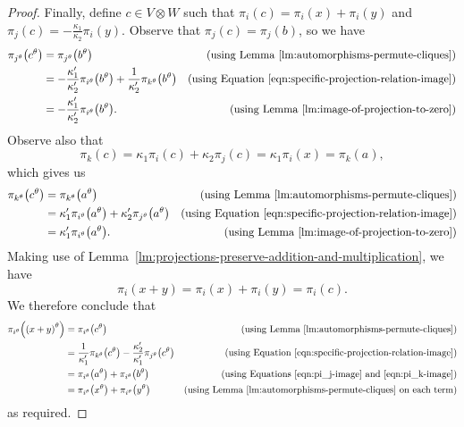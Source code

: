 \begin{proof}
Finally, define $c \in V \otimes W$ such that $\pi_i{\left(c \right)} = \pi_i{\left(x \right)} + \pi_i{\left(y \right)}$ and $\pi_j{\left(c \right)} = -\frac{\kappa_1}{\kappa_2} \pi_i{\left(y \right)}$. Observe that $\pi_j{\left(c \right)} = \pi_j{\left(b \right)}$, so we have
\begin{align}
    \pi_{j^\theta}{\left(c^\theta \right)} &= \pi_{j^\theta}{\left(b^\theta \right)} & \text{(using Lemma~\ref{lm:automorphisms-permute-cliques})} \notag \\
    &= -\frac{\kappa'_1}{\kappa'_2} \pi_{i^\theta}{\left(b^\theta \right)} + \frac{1}{\kappa'_2} \pi_{k^\theta}{\left(b^\theta \right)} & \text{(using Equation \eqref{eqn:specific-projection-relation-image})} \notag \\
    &= -\frac{\kappa'_1}{\kappa'_2} \pi_{i^\theta}{\left(b^\theta \right)}. & \text{(using Lemma~\ref{lm:image-of-projection-to-zero})} \label{eqn:pi_j-image}
\end{align}
Observe also that
\begin{displaymath}
    \pi_k{\left(c \right)} = \kappa_1 \pi_i{\left(c \right)} + \kappa_2 \pi_j{\left(c \right)} = \kappa_1 \pi_i{\left(x \right)} = \pi_k{\left(a \right)},
\end{displaymath}
which gives us
\begin{align}
    \pi_{k^\theta}{\left(c^\theta \right)} &= \pi_{k^\theta}{\left(a^\theta \right)} & \text{(using Lemma~\ref{lm:automorphisms-permute-cliques})} \notag \\
    &= \kappa'_1 \pi_{i^\theta}{\left(a^\theta \right)} + \kappa'_2 \pi_{j^\theta}{\left(a^\theta \right)} & \text{(using Equation \eqref{eqn:specific-projection-relation-image})} \notag \\
    &= \kappa'_1 \pi_{i^\theta}{\left(a^\theta \right)}. & \text{(using Lemma~\ref{lm:image-of-projection-to-zero})} \label{eqn:pi_k-image}
\end{align}
Making use of Lemma~\ref{lm:projections-preserve-addition-and-multiplication}, we have
\begin{displaymath}
    \pi_i{\left(x + y \right)} = \pi_i{\left(x \right)} + \pi_i{\left(y \right)} = \pi_i{\left(c \right)}.
\end{displaymath}
We therefore conclude that
\begin{align*}
    \pi_{i^\theta}{\left(\left(x + y \right)^\theta \right)}
    &= \pi_{i^\theta}{\left(c^\theta \right)} & \text{(using Lemma~\ref{lm:automorphisms-permute-cliques})} \\
    &= \frac{1}{\kappa'_1} \pi_{k^\theta}{\left(c^\theta \right)} -\frac{\kappa'_2}{\kappa'_1} \pi_{j^\theta}{\left(c^\theta \right)} & \text{(using Equation \eqref{eqn:specific-projection-relation-image})} \\
    &= \pi_{i^\theta}{\left(a^\theta \right)} + \pi_{i^\theta}{\left(b^\theta \right)} & \text{(using Equations \eqref{eqn:pi_j-image} and \eqref{eqn:pi_k-image})} \\
    &= \pi_{i^\theta}{\left(x^\theta \right)} + \pi_{i^\theta}{\left(y^\theta \right)} & \text{(using Lemma~\ref{lm:automorphisms-permute-cliques} on each term)}
\end{align*}
as required.
\end{proof}

